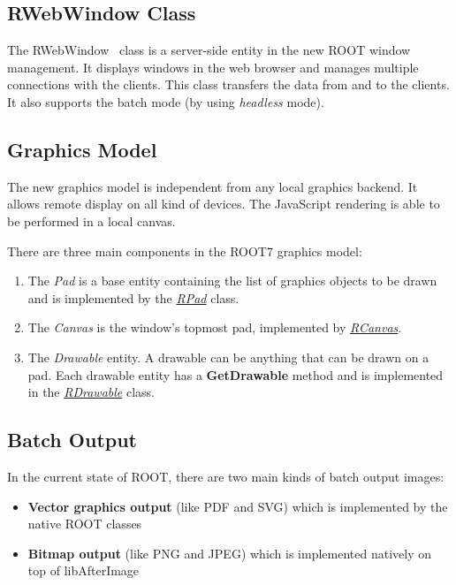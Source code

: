 \documentclass[a4paper]{jpconf}
\begin{document}
\subsection{RWebWindow Class}
The RWebWindow~\cite{rweb} class is a server-side entity in the new ROOT window management.
It displays windows in the web browser and manages multiple connections with the clients.
This class transfers the data from and to the clients. It also supports the batch
mode (by using \textit{headless} mode).

 \subsection{Graphics Model}
 The new graphics model is independent from any local graphics backend. It allows
 remote display on all kind of devices. The JavaScript rendering is able to be
 performed in a local canvas.

There are three main components in the ROOT7 graphics model:
\begin{enumerate}[label=\alph*)]
  \item The \textit{Pad} is a base entity containing the list of graphics objects to be drawn and is implemented by the \textit{\href{https://root.cern.ch/doc/master/classROOT_1_1Experimental_1_1RPad.html}{RPad}} class.
  \item The \textit{Canvas} is the window's topmost pad, implemented by \textit{\href{https://root.cern.ch/doc/master/classROOT_1_1Experimental_1_1RCanvas.html}{RCanvas}}.
  \item The \textit{Drawable} entity. A drawable can be anything that can be drawn on a pad. Each drawable entity has a \textbf{GetDrawable} method and is implemented in the \textit{\href{https://root.cern.ch/doc/master/classROOT_1_1Experimental_1_1RDrawable.html}{RDrawable}} class.
\end{enumerate}

\subsection{Batch Output}

In the current state of ROOT, there are two main kinds of batch output images:
\begin{itemize}
  \item \textbf{Vector graphics output} (like PDF and SVG) which is implemented by the native ROOT classes
  \item \textbf{Bitmap output} (like PNG and JPEG) which is implemented natively on top of libAfterImage
\end{itemize}
\end{document}
